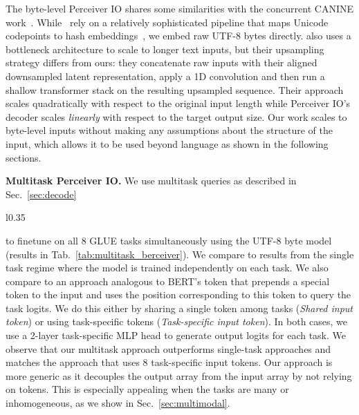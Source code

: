 \documentclass{article} \usepackage{iclr2022_conference,times}
\newcommand{\ourmodel}{Perceiver IO\xspace}
\begin{document}
The byte-level \ourmodel{} shares some similarities with the concurrent CANINE work~\citep{clark2021canine}.
While~\cite{clark2021canine} rely on a relatively sophisticated pipeline that maps Unicode codepoints to hash embeddings~\citep{svenstrup17hash}, we embed raw UTF-8 bytes directly. \cite{clark2021canine} also uses a bottleneck architecture to scale to longer text inputs, but their upsampling strategy differs from ours: they concatenate raw inputs with their aligned downsampled latent representation, apply a 1D convolution and then run a shallow transformer stack on the resulting upsampled sequence. Their approach scales quadratically with respect to the original input length while \ourmodel{}'s decoder scales \emph{linearly} with respect to the target output size. Our work scales to byte-level inputs without making any assumptions about the structure of the input, which allows it to be used beyond language as shown in the following sections.

\noindent
\textbf{Multitask \ourmodel{}.}
We use multitask queries as described in Sec.~\ref{sec:decode} 
\begin{wraptable}{l}{0.35\linewidth}
        \centering
        \caption{\small Multitask \ourmodel{}. Results use the same metric as Tab.~\ref{tab:language_res} (higher is better).}
        \label{tab:multitask_berceiver}
\end{wraptable}
to finetune on all 8 GLUE tasks simultaneously using the UTF-8 byte model (results in Tab.~\ref{tab:multitask_berceiver}). We compare to results from the single task regime where the model is trained independently on each task. 
We also compare to an approach analogous to BERT's  token that prepends a special token to the input and uses the position corresponding to this token to query the task logits.
We do this either by sharing a single token among tasks (\emph{Shared input token}) or using task-specific tokens (\emph{Task-specific input token}).
In both cases, we use a 2-layer task-specific MLP head to generate output logits for each task. 
We observe that our multitask approach outperforms single-task approaches and matches the approach that uses 8 task-specific input tokens. 
Our approach is more generic as it decouples the output array from the input array by not relying on tokens. 
This is especially appealing when the tasks are many or inhomogeneous, as we show in Sec.~\ref{sec:multimodal}.
\end{document}
